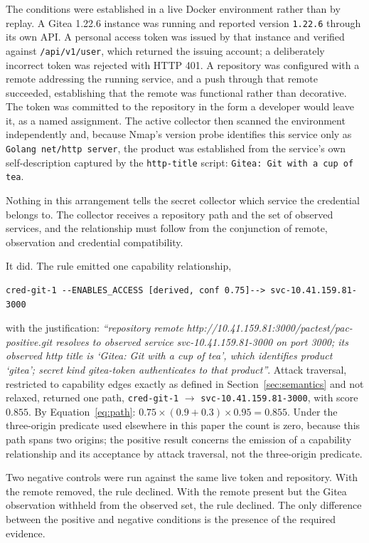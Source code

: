 \documentclass[11pt,a4paper]{article}
\begin{document}
The conditions were established in a live Docker environment rather than by
replay. A Gitea 1.22.6 instance was running and reported version
\texttt{1.22.6} through its own API. A personal access token was issued by that
instance and verified against \texttt{/api/v1/user}, which returned the issuing
account; a deliberately incorrect token was rejected with HTTP 401. A repository
was configured with a remote addressing the running service, and a push through
that remote succeeded, establishing that the remote was functional rather than
decorative. The token was committed to the repository in the form a developer
would leave it, as a named assignment. The active collector then scanned the
environment independently and, because Nmap's version probe identifies this
service only as \texttt{Golang net/http server}, the product was established
from the service's own self-description captured by the \texttt{http-title}
script: \texttt{Gitea: Git with a cup of tea}.

Nothing in this arrangement tells the secret collector which service the
credential belongs to. The collector receives a repository path and the set of
observed services, and the relationship must follow from the conjunction of
remote, observation and credential compatibility.

It did. The rule emitted one capability relationship,
\begin{verbatim}
cred-git-1 --ENABLES_ACCESS [derived, conf 0.75]--> svc-10.41.159.81-3000
\end{verbatim}
with the justification: \emph{``repository remote
http://10.41.159.81:3000/pactest/pac-positive.git resolves to observed service
svc-10.41.159.81-3000 on port 3000; its observed http title is `Gitea: Git with
a cup of tea', which identifies product `gitea'; secret kind gitea-token
authenticates to that product''}. Attack traversal, restricted to capability
edges exactly as defined in Section~\ref{sec:semantics} and not relaxed,
returned one path, \texttt{cred-git-1} $\rightarrow$
\texttt{svc-10.41.159.81-3000}, with score $0.855$. By
Equation~\eqref{eq:path}: $0.75\times(0.9+0.3)\times0.95 = 0.855$. Under the
three-origin predicate used elsewhere in this paper the count is zero, because
this path spans two origins; the positive result concerns the emission of a
capability relationship and its acceptance by attack traversal, not the
three-origin predicate.

Two negative controls were run against the same live token and repository. With
the remote removed, the rule declined. With the remote present but the Gitea
observation withheld from the observed set, the rule declined. The only
difference between the positive and negative conditions is the presence of the
required evidence.
\end{document}
